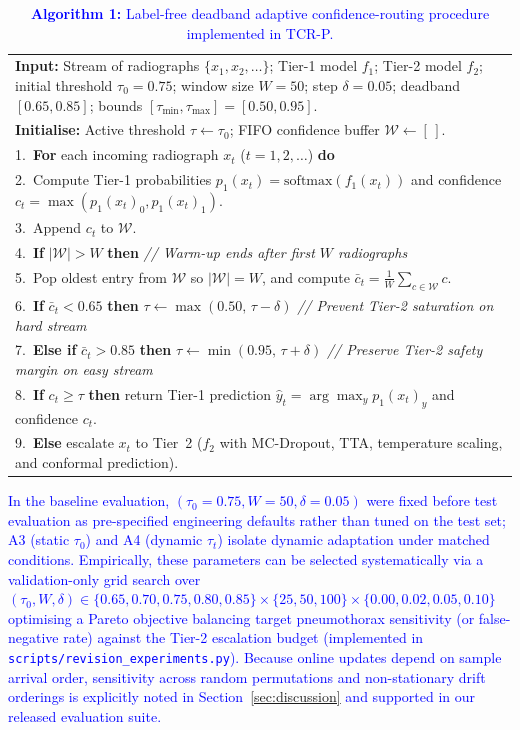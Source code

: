\documentclass[diagnostics,article,submit,moreauthors]{Definitions/mdpi}
\newcommand{\rev}[1]{\textcolor{blue}{#1}}
\begin{document}
\begin{table}[H]
\caption{\rev{\textbf{Algorithm 1:} Label-free deadband adaptive confidence-routing procedure implemented in TCR-P.}}\label{tab:algo_routing}
\begin{tabular}{@{}p{}@{}}
\toprule
\textbf{Input:} Stream of radiographs $\{x_1, x_2, \dots\}$; Tier-1 model $f_1$; Tier-2 model $f_2$; initial threshold $\tau_0=0.75$; window size $W=50$; step $\delta=0.05$; deadband $[0.65, 0.85]$; bounds $[\tau_{\min}, \tau_{\max}] = [0.50, 0.95]$.\\
\textbf{Initialise:} Active threshold $\tau \leftarrow \tau_0$; FIFO confidence buffer $\mathcal{W} \leftarrow [\,]$.\\
\midrule
1.\ \textbf{For} each incoming radiograph $x_t$ ($t = 1, 2, \dots$) \textbf{do}\\
2.\ \quad Compute Tier-1 probabilities $p_1(x_t) = \mathrm{softmax}(f_1(x_t))$ and confidence $c_t = \max(p_1(x_t)_0, p_1(x_t)_1)$.\\
3.\ \quad Append $c_t$ to $\mathcal{W}$.\\
4.\ \quad \textbf{If} $|\mathcal{W}| > W$ \textbf{then} \quad \textit{// Warm-up ends after first $W$ radiographs}\\
5.\ \quad \quad Pop oldest entry from $\mathcal{W}$ so $|\mathcal{W}| = W$, and compute $\bar{c}_t = \frac{1}{W}\sum_{c \in \mathcal{W}} c$.\\
6.\ \quad \quad \textbf{If} $\bar{c}_t < 0.65$ \textbf{then} $\tau \leftarrow \max(0.50,\, \tau - \delta)$ \quad \textit{// Prevent Tier-2 saturation on hard stream}\\
7.\ \quad \quad \textbf{Else if} $\bar{c}_t > 0.85$ \textbf{then} $\tau \leftarrow \min(0.95,\, \tau + \delta)$ \quad \textit{// Preserve Tier-2 safety margin on easy stream}\\
8.\ \quad \textbf{If} $c_t \ge \tau$ \textbf{then} return Tier-1 prediction $\hat{y}_t = \arg\max_y p_1(x_t)_y$ and confidence $c_t$.\\
9.\ \quad \textbf{Else} escalate $x_t$ to Tier~2 ($f_2$ with MC-Dropout, TTA, temperature scaling, and conformal prediction).\\
\bottomrule
\end{tabular}
\end{table}

\rev{In the baseline evaluation, $(\tau_0=0.75, W=50, \delta=0.05)$ were fixed before test evaluation as pre-specified engineering defaults rather than tuned on the test set; A3 (static $\tau_0$) and A4 (dynamic $\tau_t$) isolate dynamic adaptation under matched conditions. Empirically, these parameters can be selected systematically via a validation-only grid search over $(\tau_0, W, \delta) \in \{0.65, 0.70, 0.75, 0.80, 0.85\} \times \{25, 50, 100\} \times \{0.00, 0.02, 0.05, 0.10\}$ optimising a Pareto objective balancing target pneumothorax sensitivity (or false-negative rate) against the Tier-2 escalation budget (implemented in \texttt{scripts/revision\_experiments.py}). Because online updates depend on sample arrival order, sensitivity across random permutations and non-stationary drift orderings is explicitly noted in Section~\ref{sec:discussion} and supported in our released evaluation suite.}
\end{document}
